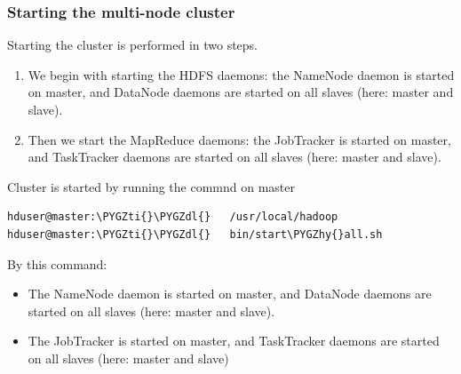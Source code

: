 \documentclass[letterpaper,10pt,english]{sphinxmanual}
\def\PYGZdl{\char`\$}
\def\PYGZhy{\char`\-}
\def\PYGZti{\char`\~}
\begin{document}
\subsubsection{Starting the multi-node cluster}
\label{hadoop:starting-the-multi-node-cluster}
Starting the cluster is performed in two steps.
\begin{enumerate}
\item {} 
We begin with starting the HDFS daemons: the NameNode daemon is started on master, and DataNode daemons are started on all slaves (here: master and slave).

\item {} 
Then we start the MapReduce daemons: the JobTracker is started on master, and TaskTracker daemons are started on all slaves (here: master and slave).

\end{enumerate}

Cluster is started by running the commnd on master

\begin{Verbatim}[commandchars=\\\{\}]
hduser@master:\PYGZti{}\PYGZdl{}   /usr/local/hadoop
hduser@master:\PYGZti{}\PYGZdl{}   bin/start\PYGZhy{}all.sh
\end{Verbatim}
\begin{figure}[htbp]
\centering

\end{figure}

By this command:
\begin{itemize}
\item {} 
The NameNode daemon is started on master, and DataNode daemons are started on all slaves (here: master and slave).

\item {} 
The JobTracker is started on master, and TaskTracker daemons are started on all slaves (here: master and slave)

\end{itemize}
\end{document}
